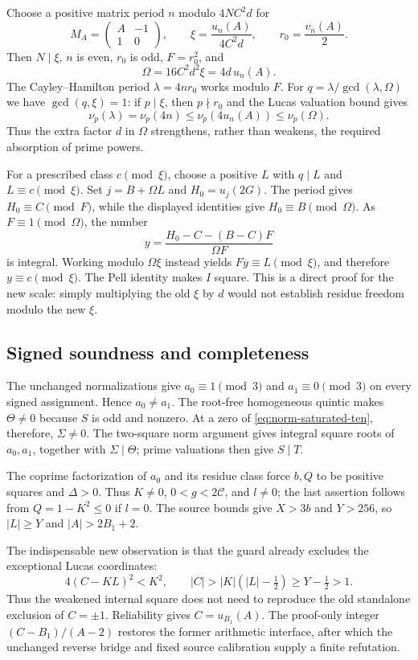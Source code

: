Choose a positive matrix period $n$ modulo $4NC^2d$ for
\[
 M_A=\begin{pmatrix}A&-1\\1&0\end{pmatrix},
 \qquad \xi=\frac{u_n(A)}{4C^2d},\qquad r_0=\frac{v_n(A)}2.
\]
Then $N\mid\xi$, $n$ is even, $r_0$ is odd, $F=r_0^2$, and
\[
 \Omega=16C^2d^2\xi=4d\,u_n(A).
\]
The Cayley--Hamilton period $\lambda=4nr_0$ works modulo $F$.
For $q=\lambda/\gcd(\lambda,\Omega)$ we have
$\gcd(q,\xi)=1$: if $p\mid\xi$, then $p\nmid r_0$ and the Lucas
valuation bound gives
\[
 \nu_p(\lambda)=\nu_p(4n)
 \le\nu_p(4u_n(A))\le\nu_p(\Omega).
\]
Thus the extra factor $d$ in $\Omega$ strengthens, rather than weakens,
the required absorption of prime powers.

For a prescribed class $c\pmod\xi$, choose a positive $L$ with
$q\mid L$ and $L\equiv c\pmod\xi$. Set
$j=B+\Omega L$ and $H_0=u_j(2G)$.
The period gives $H_0\equiv C\pmod F$, while the displayed
identities give $H_0\equiv B\pmod\Omega$.
As $F\equiv1\pmod\Omega$, the number
\[
 y=\frac{H_0-C-(B-C)F}{\Omega F}
\]
is integral. Working modulo $\Omega\xi$ instead yields
$Fy\equiv L\pmod\xi$, and therefore $y\equiv c\pmod\xi$.
The Pell identity makes $I$ square. This is a direct proof for the new
scale: simply multiplying the old $\xi$ by $d$ would not establish
residue freedom modulo the new $\xi$.

\subsection{Signed soundness and completeness}

The unchanged normalizations give $a_0\equiv1\pmod3$ and
$a_1\equiv0\pmod3$ on every signed assignment. Hence $a_0\ne a_1$.
The root-free homogeneous quintic makes $\Theta\ne0$ because $S$ is
odd and nonzero. At a zero of \eqref{eq:norm-saturated-ten}, therefore,
$\Sigma\ne0$. The two-square norm argument gives integral square roots
of $a_0,a_1$, together with $\Sigma\mid\Theta$; prime valuations then
give $S\mid T$.

The coprime factorization of $a_0$ and its residue class force $b,Q$ to
be positive squares and $\Delta>0$. Thus $K\ne0$, $0<g<2\mathscr C$,
and $l\ne0$; the last assertion follows from $Q=1-K^2\le0$ if $l=0$.
The source bounds give $X>3b$ and $Y>256$, so $|L|\ge Y$ and
$|A|>2B_1+2$.

The indispensable new observation is that the guard already excludes
the exceptional Lucas coordinates:
\[
 4(C-KL)^2<K^2,\qquad
 |C|>|K|(|L|-\tfrac12)\ge Y-\tfrac12>1.
\]
Thus the weakened internal square does not need to reproduce the old
standalone exclusion of $C=\pm1$. Reliability gives $C=u_{B_1}(A)$.
The proof-only integer $(C-B_1)/(A-2)$ restores the former arithmetic
interface, after which the unchanged reverse bridge and fixed source
calibration supply a finite refutation.


